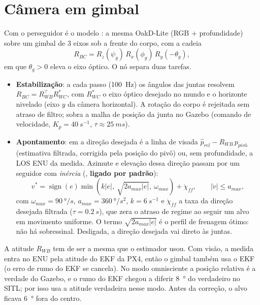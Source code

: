 \section{Câmera em gimbal}
\label{sec:gimbal}
Com  o perseguidor é o modelo : a
mesma OakD-Lite (RGB + profundidade) sobre um gimbal de 3 eixos sob a frente do corpo, com a cadeia
\begin{equation}
  R_{BC} = R_z(\psi_g)\,R_x(\phi_g)\,R_y(-\theta_g),
\end{equation}
em que $\theta_g>0$ eleva o eixo óptico. O nó  separa duas tarefas.
\begin{itemize}
  \item \textbf{Estabilização}: a cada passo (\SI{100}{Hz}) os ângulos das juntas resolvem
        $R_{BC}=R_{WB}^{\top}R_{WC}^{*}$, com $R_{WC}^{*}$ o eixo óptico desejado no mundo e o
        horizonte nivelado (eixo $y$ da câmera horizontal). A rotação do corpo é rejeitada sem
        atraso de filtro; sobra a malha de posição da junta no Gazebo (comando de velocidade,
        $K_p=\SI{40}{s^{-1}}$, $\tau\approx\SI{25}{ms}$).
  \item \textbf{Apontamento}: em  a direção desejada é a linha de visada
        $\hat p_{rel}-R_{WB}\,p_{pivô}$ (estimativa filtrada, corrigida pela posição do pivô) ou,
        sem profundidade, a LOS ENU da medida. Azimute e elevação dessa direção passam por um
        seguidor com \emph{inércia} (, \textbf{ligado por padrão}):
        \begin{equation}
          v^{*}=\operatorname{sign}(e)\min\!\left(k|e|,\ \sqrt{2a_{max}|e|},\ \omega_{max}\right)+\dot\chi_{ff},
          \qquad |\dot v|\le a_{max},
        \end{equation}
        com $\omega_{max}=\SI{90}{\degree/s}$, $a_{max}=\SI{360}{\degree/s^2}$, $k=\SI{6}{s^{-1}}$ e
        $\dot\chi_{ff}$ a taxa da direção desejada filtrada ($\tau=\SI{0.2}{s}$), que zera o
        atraso de regime ao seguir um alvo em movimento uniforme. O termo $\sqrt{2a_{max}|e|}$ é o
        perfil de frenagem ótimo: não há sobressinal. Desligada, a direção desejada vai direto às
        juntas.
\end{itemize}
A atitude $R_{WB}$ tem de ser a mesma que o estimador usou. Com visão, a medida entra no ENU pela
atitude do EKF da PX4, então o gimbal também usa o EKF (o erro de rumo do EKF se cancela). No modo
omnisciente a posição relativa é a verdade do Gazebo, e o rumo do EKF chegou a diferir
\SI{8}{\degree} do verdadeiro no SITL; por isso  usa a atitude verdadeira
nesse modo. Antes da correção, o alvo ficava \SI{6}{\degree} fora do centro.


